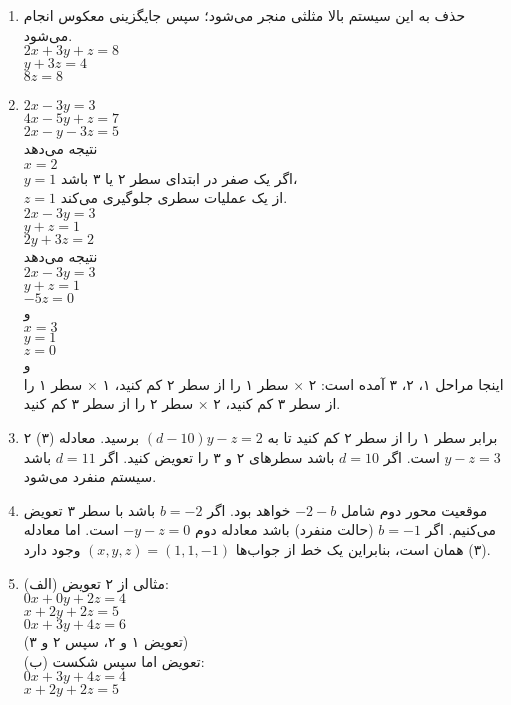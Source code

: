 \documentclass[12pt]{article}
\begin{document}
\begin{enumerate}
		\item حذف به این سیستم بالا مثلثی منجر می‌شود؛ سپس جایگزینی معکوس انجام می‌شود. \\
		$2x +3y + z=8$ \\
		$y +3z =4$ \\
		$8z = 8$
		\item 
		$2x−3y=3$ \\
		$4x −5y + z=7$ \\
		$2x − y−3z=5$ \\
		نتیجه می‌دهد \\
		$x =2$ \\
		$y =1$ اگر یک صفر در ابتدای سطر ۲ یا ۳ باشد، \\
		$z =1$ از یک عملیات سطری جلوگیری می‌کند. \\
		$2x −3y =3$ \\
		$y + z=1$ \\
		$2y +3z =2$ \\
		نتیجه می‌دهد \\
		$2x −3y =3$ \\
		$y + z=1$ \\
		$−5z =0$ \\
		و \\
		$x =3$ \\
		$y =1$ \\
		$z =0$ \\
		و \\
		اینجا مراحل ۱، ۲، ۳ آمده است: ۲ × سطر ۱ را از سطر ۲ کم کنید، ۱ × سطر ۱ را از سطر ۳ کم کنید، ۲ × سطر ۲ را از سطر ۳ کم کنید.
		\item ۲ برابر سطر ۱ را از سطر ۲ کم کنید تا به $(d−10)y−z = 2$ برسید. معادله (۳) $y−z = 3$ است. اگر $d=10$ باشد سطرهای ۲ و ۳ را تعویض کنید. اگر $d=11$ باشد سیستم منفرد می‌شود.
		\item موقعیت محور دوم شامل $−2−b$ خواهد بود. اگر $b=−2$ باشد با سطر ۳ تعویض می‌کنیم. اگر $b=−1$ (حالت منفرد) باشد معادله دوم $−y−z=0$ است. اما معادله (۳) همان است، بنابراین یک خط از جواب‌ها $(x,y,z) = (1,1,−1)$ وجود دارد.
		\item (الف) مثالی از ۲ تعویض: \\
		$0x +0y +2z =4$ \\
		$x +2y+2z =5$ \\
		$0x +3y +4z =6$ \\
		(تعویض ۱ و ۲، سپس ۲ و ۳) \\
		(ب) تعویض اما سپس شکست: \\
		$0x +3y +4z =4$ \\
		$x +2y+2z =5$ \\

\end{enumerate}
\end{document}
